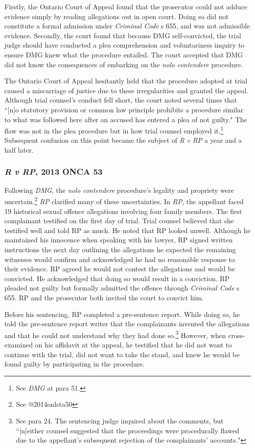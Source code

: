 Firstly, the Ontario Court of Appeal found that the prosecutor could not adduce evidence simply by reading allegations out in open court. Doing so did not constitute a formal admission under \textit{Criminal Code} s 655, and was not admissible evidence. Secondly, the court found that because DMG self-convicted, the trial judge should have conducted a plea comprehension and voluntariness inquiry to ensure DMG knew what the procedure entailed. The court accepted that DMG did not know the consequences of embarking on the \textit{nolo contendere} procedure. 

The Ontario Court of Appeal hesitantly held that the procedure adopted at trial caused a miscarriage of justice due to these irregularities and granted the appeal. Although trial counsel's conduct fell short, the court noted several times that ``[n]o statutory provision or common law principle prohibits a procedure similar to what was followed here after an accused has entered a plea of not guilty." The flaw was not in the plea procedure but in how trial counsel employed it.\footnote{See \textit{DMG} at para 51.} Subsequent confusion on this point became the subject of \textit{R v RP} a year and a half later.

\subsubsection{\textit{R v RP}, 2013 ONCA 53}

Following \textit{DMG}, the \textit{nolo contendere} procedure's legality and propriety were uncertain.\footnote{See @2014onlsta50} \textit{RP} clarified many of these uncertainties. In \textit{RP}, the appellant faced 19 historical sexual offence allegations involving four family members. The first complainant testified on the first day of trial. Trial counsel believed that she testified well and told RP as much. He noted that RP looked unwell. Although he maintained his innocence when speaking with his lawyer, RP signed written instructions the next day outlining the allegations he expected the remaining witnesses would confirm and acknowledged he had no reasonable response to their evidence. RP agreed he would not contest the allegations and would be convicted. He acknowledged that doing so would result in a conviction. RP pleaded not guilty but formally admitted the offence through \textit{Criminal Code} s 655. RP and the prosecutor both invited the court to convict him.

Before his sentencing, RP completed a pre-sentence report. While doing so, he told the pre-sentence report writer that the complainants invented the allegations and that he could not understand why they had done so.\footnote{See para 24. The sentencing judge inquired about the comments, but ``[n]either counsel suggested that the proceedings were procedurally flawed due to the appellant's subsequent rejection of the complainants' accounts."} However, when cross-examined on his affidavit at the appeal, he testified that he did not want to continue with the trial, did not want to take the stand, and knew he would be found guilty by participating in the procedure.

